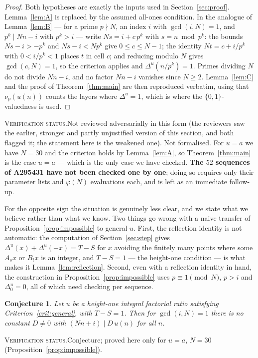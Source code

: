 \documentclass[11pt]{article}
\theoremstyle{plain}
\newtheorem{conjecture}[theorem]{Conjecture}
\theoremstyle{definition}
\theoremstyle{remark}
\numberwithin{equation}{section}
\newcommand{\vstatus}[1]{%
  \par\vspace{3pt}\noindent
  {\small\textsc{Verification status.}\enspace #1}\par\vspace{3pt}}
\begin{document}
\begin{proof}
Both hypotheses are exactly the inputs used in Section~\ref{sec:proof}. Lemma~\ref{lem:A} is
replaced by the assumed all-ones condition. In the analogue of Lemma~\ref{lem:B} --- for a prime
$p \nmid N$, an index $i$ with $\gcd(i,N)=1$, and $p^k \mid Nn-i$ with $p^k > i$ --- write
$Ns = i + c\,p^k$ with $s = n \bmod p^k$: the bounds $Ns - i > -p^k$ and $Ns - i < N p^k$ give
$0 \le c \le N-1$; the identity $Nt = c + i/p^k$ with $0 < i/p^k < 1$ places $t$ in cell $c$; and
reducing modulo $N$ gives $\gcd(c,N)=1$, so the criterion applies and $\Delta^u(n/p^k) = 1$.
Primes dividing $N$ do not divide $Nn-i$, and no factor $Nn-i$ vanishes since $N \ge 2$.
Lemma~\ref{lem:C} and the proof
of Theorem~\ref{thm:main} are then reproduced verbatim, using that $\nu_p(u(n))$ counts the
layers where $\Delta^u = 1$, which is where the $\{0,1\}$-valuedness is used.
\end{proof}
\vstatus{Not reviewed adversarially in this form (the reviewers saw the earlier, stronger and
partly unjustified version of this section, and both flagged it; the statement here is the
weakened one). Not formalised. For $u = a$ we have $N = 30$ and the criterion holds by
Lemma~\ref{lem:A}, so Theorem~\ref{thm:main} is the case $u = a$ --- which is the only case we
have checked. \textbf{The $52$ sequences of A295431 have not been checked one by one}; doing so
requires only their parameter lists and $\varphi(N)$ evaluations each, and is left as an
immediate follow-up.}

For the opposite sign the situation is genuinely less clear, and we state what we believe rather
than what we know. Two things go wrong with a naive transfer of Proposition~\ref{prop:impossible}
to general $u$. First, the reflection identity is not automatic: the computation of
Section~\ref{sec:step} gives $\Delta^u(x)+\Delta^u(-x) = T - S$ for $x$ avoiding the finitely
many points where some $A_s x$ or $B_t x$ is an integer, and $T-S=1$ --- the height-one
condition --- is what makes it Lemma~\ref{lem:reflection}. Second, even with a reflection
identity in hand, the construction in Proposition~\ref{prop:impossible} uses $p \equiv 1
\pmod N$, $p > i$ and $\Delta^u_0 = 0$, all of which need checking per sequence.

\begin{conjecture}
\label{conj:general}
Let $u$ be a height-one integral factorial ratio satisfying Criterion~\ref{crit:general}, with
$T - S = 1$. Then for $\gcd(i,N)=1$ there is no constant $D \ne 0$ with
$(Nn+i) \mid D\,u(n)$ for all $n$.
\end{conjecture}
\vstatus{Conjecture; proved here only for $u = a$, $N = 30$
(Proposition~\ref{prop:impossible}).}
\end{document}
